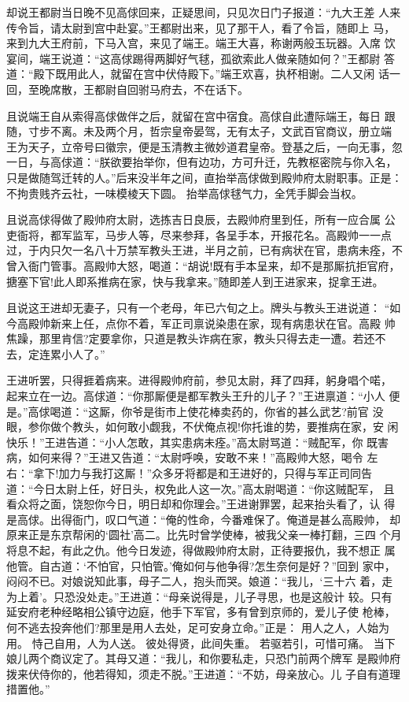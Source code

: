 却说王都尉当日晚不见高俅回来，正疑思间，只见次日门子报道：“九大王差
人来传令旨，请太尉到宫中赴宴。”王都尉出来，见了那干人，看了令旨，随即上
马，来到九大王府前，下马入宫，来见了端王。端王大喜，称谢两般玉玩器。入席
饮宴间，端王说道：“这高俅踢得两脚好气毬，孤欲索此人做亲随如何？”王都尉
答道：“殿下既用此人，就留在宫中伏侍殿下。”端王欢喜，执杯相谢。二人又闲
话一回，至晚席散，王都尉自回驸马府去，不在话下。

且说端王自从索得高俅做伴之后，就留在宫中宿食。高俅自此遭际端王，每日
跟随，寸步不离。未及两个月，哲宗皇帝晏驾，无有太子，文武百官商议，册立端
王为天子，立帝号曰徽宗，便是玉清教主微妙道君皇帝。登基之后，一向无事，忽
一日，与高俅道：“朕欲要抬举你，但有边功，方可升迁，先教枢密院与你入名，
只是做随驾迁转的人。”后来没半年之间，直抬举高俅做到殿帅府太尉职事。正是：
不拘贵贱齐云社，一味模棱天下圆。
抬举高俅毬气力，全凭手脚会当权。

且说高俅得做了殿帅府太尉，选拣吉日良辰，去殿帅府里到任，所有一应合属
公吏衙将，都军监军，马步人等，尽来参拜，各呈手本，开报花名。高殿帅一一点
过，于内只欠一名八十万禁军教头王进，半月之前，已有病状在官，患病未痊，不
曾入衙门管事。高殿帅大怒，喝道：“胡说!既有手本呈来，却不是那厮抗拒官府，
搪塞下官!此人即系推病在家，快与我拿来。”随即差人到王进家来，捉拿王进。

且说这王进却无妻子，只有一个老母，年已六旬之上。牌头与教头王进说道：
“如今高殿帅新来上任，点你不着，军正司禀说染患在家，现有病患状在官。高殿
帅焦躁，那里肯信?定要拿你，只道是教头诈病在家，教头只得去走一遭。若还不
去，定连累小人了。”

王进听罢，只得捱着病来。进得殿帅府前，参见太尉，拜了四拜，躬身唱个喏，
起来立在一边。高俅道：“你那厮便是都军教头王升的儿子？”王进禀道：“小人
便是。”高俅喝道：“这厮，你爷是街市上使花棒卖药的，你省的甚么武艺?前官
没眼，参你做个教头，如何敢小觑我，不伏俺点视!你托谁的势，要推病在家，安
闲快乐！”王进告道：“小人怎敢，其实患病未痊。”高太尉骂道：“贼配军，你
既害病，如何来得？”王进又告道：“太尉呼唤，安敢不来！”高殿帅大怒，喝令
左右：“拿下!加力与我打这厮！”众多牙将都是和王进好的，只得与军正司同告
道：“今日太尉上任，好日头，权免此人这一次。”高太尉喝道：“你这贼配军，
且看众将之面，饶恕你今日，明日却和你理会。”王进谢罪罢，起来抬头看了，认
得是高俅。出得衙门，叹口气道：“俺的性命，今番难保了。俺道是甚么高殿帅，
却原来正是东京帮闲的‘圆社’高二。比先时曾学使棒，被我父亲一棒打翻，三四
个月将息不起，有此之仇。他今日发迹，得做殿帅府太尉，正待要报仇，我不想正
属他管。自古道：‘不怕官，只怕管。’俺如何与他争得?怎生奈何是好？”回到
家中，闷闷不已。对娘说知此事，母子二人，抱头而哭。娘道：“我儿，‘三十六
着，走为上着’。只恐没处走。”王进道：“母亲说得是，儿子寻思，也是这般计
较。只有延安府老种经略相公镇守边庭，他手下军官，多有曾到京师的，爱儿子使
枪棒，何不逃去投奔他们?那里是用人去处，足可安身立命。”正是：
用人之人，人始为用。
恃己自用，人为人送。
彼处得贤，此间失重。
若驱若引，可惜可痛。
当下娘儿两个商议定了。其母又道：“我儿，和你要私走，只恐门前两个牌军
是殿帅府拨来伏侍你的，他若得知，须走不脱。”王进道：“不妨，母亲放心。儿
子自有道理措置他。”

